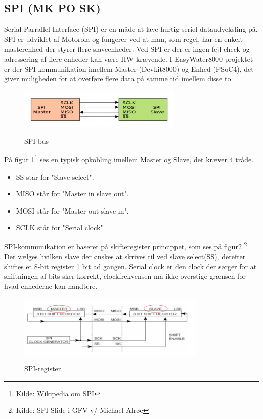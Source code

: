 \subsection{SPI (MK PO SK)}

Serial Parrallel Interface (SPI) er en måde at lave hurtig seriel dataudveksling på. SPI er udviklet af Motorola og fungerer ved at man, som regel, har en enkelt masterenhed der styrer flere slaveenheder. Ved SPI er der er ingen fejl-check og adressering af flere enheder kan være HW krævende. I EasyWater8000 projektet er der SPI kommunikation imellem Master (Devkit8000) og Enhed (PSoC4), det giver muligheden for at overføre flere data på samme tid imellem disse to.

\begin{figure}[H] \centering
{\includegraphics[width=0.7\textwidth]{billeder/design_spi_master_slave}}
\caption{SPI-bus}
\label{fig:design_spi_bus}
\raggedright
\end{figure}

På figur \ref{fig:design_spi_bus}\footnote{Kilde: Wikipedia om SPI} ses en typisk opkobling imellem Master og Slave, det kræver 4 tråde.

\begin{itemize}
 	\item SS står for "Slave select".
 	\item MISO står for "Master in slave out".
 	\item MOSI står for "Master out slave in". 
	\item SCLK står for "Serial clock" 
\end{itemize}

SPI-kommunikation er baseret på skifteregister princippet, som ses på figur\ref{fig:design_spi_register} \footnote{Kilde: SPI Slide i GFV v/ Michael Alrøe}. Der vælges hvilken slave der ønskes at skrives til ved slave select(SS), derefter shiftes et 8-bit register 1 bit ad gangen. Serial clock er den clock der sørger for at shiftningen af bits sker korrekt, clockfrekvensen må ikke overstige grænsen for hvad enhederne kan håndtere.

\begin{figure}[H] \centering
{\includegraphics[width=0.8\textwidth]{billeder/design_spi_register}}
\caption{SPI-register}
\label{fig:design_spi_register}
\raggedright
\end{figure}  

